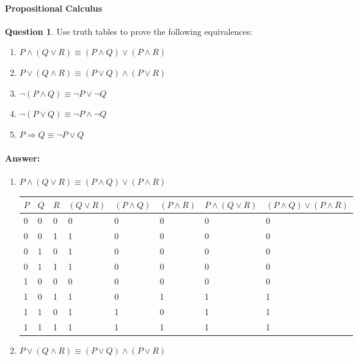 \documentclass[11pt,a4paper]{article}
\theoremstyle{definition}%
\newtheorem{Q}{Question}[] %
\newcommand{\reponse}[1]{%
\ifthenelse {\boolean{corrige}} {\paragraph{Answer:} \color{darkblue}   #1\color{black}} {}
}
\begin{document}
\paragraph{Propositional Calculus}
\begin{Q}
Use truth tables to prove the following equivalences:
\begin{enumerate}
    \item $P \wedge (Q \vee R) \equiv (P \wedge Q) \vee (P \wedge R)$
    \item $P \vee (Q \wedge R) \equiv (P \vee Q) \wedge (P \vee R)$
    \item $\neg(P \wedge Q) \equiv \neg P \vee \neg Q$
    \item $\neg(P \vee Q) \equiv \neg P \wedge \neg Q$
    \item $P \Rightarrow Q \equiv \neg P \vee Q $
\end{enumerate}

\reponse{
\begin{enumerate}
    \item $P \wedge (Q \vee R) \equiv (P \wedge Q) \vee (P \wedge R)$

\begin{tabular}{|l|l|l|l|l|l|l|l|}
\hline
$P$ & $Q$ & $R$ & $(Q \vee R)$ & $(P \wedge Q)$ & $(P \wedge R)$ & $P \wedge (Q \vee R)$ & $(P \wedge Q) \vee (P \wedge R)$ \\ \hline
0   & 0   & 0   & 0            & 0              & 0              & 0                     & 0                                \\ \hline
0   & 0   & 1   & 1            & 0              & 0              & 0                     & 0                                \\ \hline
0   & 1   & 0   & 1            & 0              & 0              & 0                     & 0                                \\ \hline
0   & 1   & 1   & 1            & 0              & 0              & 0                     & 0                                \\ \hline
1   & 0   & 0   & 0            & 0              & 0              & 0                     & 0                                \\ \hline
1   & 0   & 1   & 1            & 0              & 1              & 1                     & 1                                \\ \hline
1   & 1   & 0   & 1            & 1              & 0              & 1                     & 1                                \\ \hline
1   & 1   & 1   & 1            & 1              & 1              & 1                     & 1                                \\ \hline
\end{tabular}
    \item $P \vee (Q \wedge R) \equiv (P \vee Q) \wedge (P \vee R)$


\end{enumerate}}
\end{Q}
\end{document}
